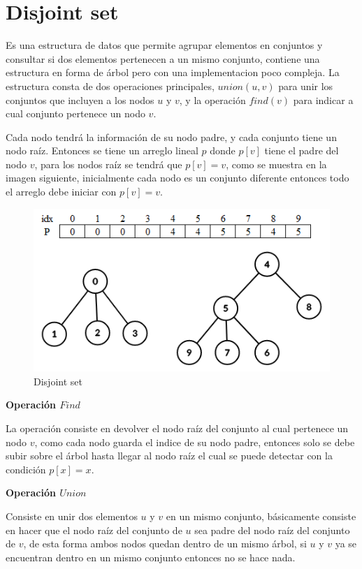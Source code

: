 \documentclass[12pt, a4paper]{article}
\newcommand{\subtitulo}[1]{\begin{center}\textbf{#1}\end{center}}
\begin{document}
	\section{Disjoint set}
	Es una estructura de datos que permite agrupar elementos en conjuntos y consultar si dos elementos
	pertenecen a un mismo conjunto, contiene una estructura en forma de árbol pero con una implementacion poco
	compleja. La estructura consta de dos operaciones principales, $union(u, v)$ para unir los conjuntos que incluyen 
	a los nodos $u$ y $v$, y la operación $find(v)$ para indicar a cual conjunto pertenece un nodo $v$.
	
	Cada nodo tendrá la información de su nodo padre, y cada conjunto tiene un nodo raíz. Entonces se tiene un 
	arreglo lineal $p$ donde $p[v]$ tiene el padre del nodo $v$, para los nodos raíz se tendrá que $p[v]=v$, 
	como se muestra en la imagen siguiente, inicialmente cada nodo es un conjunto diferente entonces todo el arreglo 
	debe iniciar con $p[v]=v$.
	
	\begin{figure}[h!]
		\centering
		\includegraphics[scale=0.7]{Estructuras_de_datos/imagenes/Disjoint_set/DisjointSet}
		\caption{Disjoint set}
	\end{figure}
	
	\subtitulo{Operación $Find$}
	
	La operación consiste en devolver el nodo raíz del conjunto al cual pertenece un nodo $v$, como cada nodo
	guarda el indice de su nodo padre, entonces solo se debe subir sobre el árbol hasta llegar al nodo raíz
	el cual se puede detectar con la condición $p[x]=x$.
	
	\subtitulo{Operación $Union$}
	
	Consiste en unir dos elementos $u$ y $v$ en un mismo conjunto, básicamente consiste en hacer que el nodo raíz 
	del conjunto de $u$ sea padre del nodo raíz del conjunto de $v$, de esta forma ambos nodos quedan dentro de un 
	mismo árbol, si $u$ y $v$ ya se encuentran dentro en un mismo conjunto entonces no se hace nada.
\end{document}
